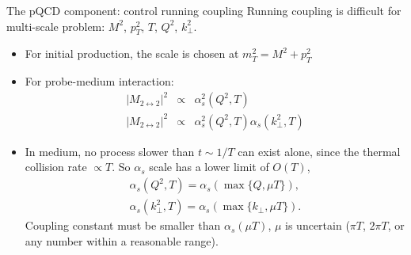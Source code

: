 \documentclass[11pt]{beamer}
\begin{document}
\begin{frame}{The pQCD component: control running coupling}
Running coupling is difficult for multi-scale problem:
{\color{red} $M^2$, $p_T^2$}, {\color{blue}$T$, $Q^2$, $k_\perp^2$}.
\begin{itemize}
\item For initial production, the scale is chosen at $m_T^2 = M^2 + p_T^2$
\item For probe-medium interaction:
\begin{eqnarray}
\nonumber
|M_{2\leftrightarrow 2}|^2 &\propto& \alpha_s^2(Q^2, T) \\
\nonumber
|M_{2\leftrightarrow 2}|^2 &\propto& \alpha_s^2(Q^2, T) \alpha_s(k_\perp^2, T)
\end{eqnarray}
\item In medium, no process slower than $t\sim 1/T$ can exist alone, since the thermal collision rate $\propto T$. So $\alpha_s$ scale has a lower limit of $O(T)$,
\begin{eqnarray}
\nonumber
\alpha_s(Q^2, T) = \alpha_s(\max\{Q, \mu T\}),\\
\nonumber
\alpha_s(k_\perp^2, T) = \alpha_s(\max\{k_\perp, \mu T\}).
\end{eqnarray}
Coupling constant must be smaller than $\alpha_s(\mu T)$, $\mu$ is uncertain ($\pi T$, $2\pi T$, or any number within a reasonable range).
\end{itemize}
\end{frame}
\end{document}
